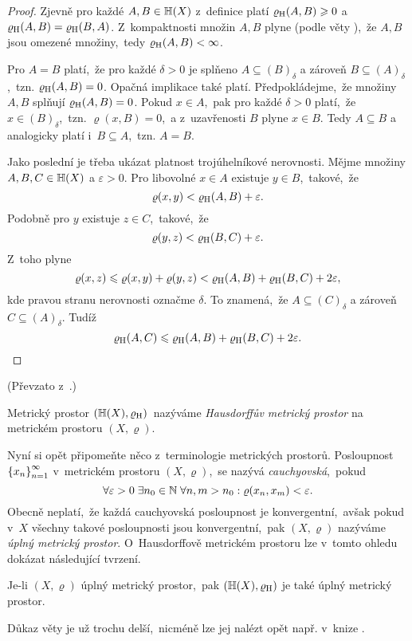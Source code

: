 \begin{proof}
    Zjevně pro každé $A,B\in\mathbb{H}(X)$ z~definice platí $\varrho_\textup{H}(A,B)\geqslant 0$ a $\varrho_\textup{H}(A,B)=\varrho_\textup{H}(B,A)$. Z~kompaktnosti množin $A,B$ plyne (podle věty ),~že $A,B$ jsou omezené množiny,~tedy $\varrho_\textup{H}(A,B)<\infty$.
    
    Pro $A=B$ platí,~že pro každé $\delta>0$ je splňeno $A\subseteq (B)_\delta$ a zároveň $B\subseteq (A)_\delta$,~tzn. $\varrho_\textup{H}(A,B)=0$. Opačná implikace také platí. Předpokládejme,~že množiny $A,B$ splňují $\varrho_\textup{H}(A,B)=0$. Pokud $x\in A$,~pak pro každé $\delta>0$ platí,~že $x\in (B)_\delta$,~tzn. $\varrho(x,B)=0$,~a z~uzavřenosti $B$ plyne $x\in B$. Tedy $A\subseteq B$ a analogicky platí i~$B\subseteq A$,~tzn. $A=B$.

    Jako poslední je třeba ukázat platnost trojúhelníkové nerovnosti. Mějme množiny $A,B,C\in\mathbb{H}(X)$ a $\varepsilon>0$. Pro libovolné $x\in A$ existuje $y\in B$,~takové,~že
    \[\varrho(x,y)<\varrho_\textup{H}(A,B)+\varepsilon.\]
    Podobně pro $y$ existuje $z\in C$,~takové,~že
    \[\varrho(y,z)<\varrho_\textup{H}(B,C)+\varepsilon.\]
    Z~toho plyne
    \[\varrho(x,z)\leqslant\varrho(x,y)+\varrho(y,z)<\varrho_\textup{H}(A,B)+\varrho_\textup{H}(B,C)+2\varepsilon,\]
    kde pravou stranu nerovnosti označme $\delta$. To znamená,~že $A\subseteq (C)_\delta$ a zároveň $C\subseteq (A)_\delta$. Tudíž
    \[\varrho_\textup{H}(A,C)\leqslant\varrho_\textup{H}(A,B)+\varrho_\textup{H}(B,C)+2\varepsilon.\]
\end{proof}
(Převzato z~\citep[str. 72]{Edgar2008}.)
\begin{definition}\label{def:hausdorffuv-mp}
    Metrický prostor $(\mathbb{H}(X),\varrho_\textup{H})$~nazýváme \emph{Hausdorffův metrický prostor} na metrickém prostoru $(X,\varrho)$.
\end{definition}
Nyní si opět připomeňte něco z~terminologie metrických prostorů. Posloupnost $\left\{x_n\right\}_{n=1}^\infty$ v~metrickém prostoru $(X,\varrho)$,~se nazývá \emph{cauchyovská},~pokud
\[\forall\varepsilon>0\;\exists n_0\in\mathbb{N}\;\forall n,m>n_0: \varrho(x_n,x_m)<\varepsilon.\]
Obecně neplatí,~že každá cauchyovská posloupnost je konvergentní,~avšak pokud v~$X$ všechny takové posloupnosti jsou konvergentní,~pak $(X,\varrho)$ nazýváme \emph{úplný metrický prostor}. O~Hausdorffově metrickém prostoru lze v~tomto ohledu dokázat následující tvrzení.
\begin{theorem}\label{thm:uplnost-hmp}
    Je-li $(X,\varrho)$ úplný metrický prostor,~pak $(\mathbb{H}(X),\varrho_\textup{H})$ je také úplný metrický prostor.
\end{theorem}
Důkaz věty je už trochu delší,~nicméně lze jej nalézt opět např. v~knize \citep[str. 72]{Edgar2008}.